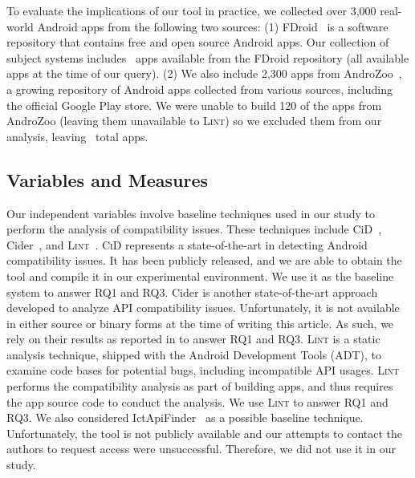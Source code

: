 To evaluate the implications of our tool in practice, we collected over 3,000 real-world Android apps from the following two sources:
(1) FDroid~\cite{fdroid} is a software
repository that contains free and open source Android
apps.  Our collection of subject systems includes 
\fdroidct\ apps available from the FDroid repository (all available apps at the time of our query). 
(2) We also include 2,300 apps from AndroZoo~\cite{allix2016androzoo}, a growing repository of Android apps
collected from various sources, including the official Google Play store. 
We were unable to build 120 of the apps from AndroZoo (leaving them unavailable to \textsc{Lint}) so we excluded them from our analysis, leaving \apptotal~total apps.

\subsection{Variables and Measures}

Our independent variables involve baseline techniques used
in our study to perform the analysis of compatibility issues.
These techniques include {\sc CiD}~\cite{lili2018cid}, {\sc
Cider}~\cite{huang2018understanding}, and
\textsc{Lint}~\cite{linttips}.
\textsc{CiD} represents a state-of-the-art in detecting
Android compatibility issues. It has been publicly released,
and we are able to obtain the tool and compile it in our
experimental environment.  We use it as the baseline system
to answer RQ1 and RQ3.
{\sc Cider} is another state-of-the-art approach developed to analyze API compatibility issues. Unfortunately, it is not available in  either source or binary forms at the
time of writing this article.  As such, we rely on their results as reported in \cite{huang2018understanding} to answer RQ1 and RQ3.
\textsc{Lint} is a static analysis technique, shipped
with the Android Development Tools (ADT), to examine
code bases for potential bugs, including incompatible
API usages.  \textsc{Lint} performs the compatibility
analysis as part of building apps, and thus requires the app source code to conduct the analysis. We use \textsc{Lint} to answer RQ1 and RQ3.
We also considered {\sc
IctApiFinder}~\cite{he2018understanding} as a possible
baseline technique. 
Unfortunately, the tool is not publicly available and
our attempts to contact the authors to request access
were unsuccessful. Therefore, we did not use it in our
study.

